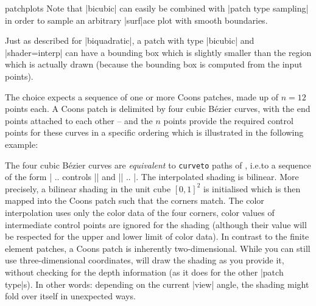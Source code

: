 {\begin{pgfplotslibrary}{patchplots}
Note that |bicubic| can easily be combined with |patch type sampling| in order
to sample an arbitrary |surf|ace plot with smooth boundaries.

Just as described for |biquadratic|, a patch with type |bicubic| and
|shader=interp| can have a bounding box which is slightly smaller than the
region which is actually drawn (because the bounding box is computed from the
input points).

The choice  expects a sequence of one or more Coons
patches, made up of $n=12$ points each. A Coons patch is delimited by four
cubic B\'ezier curves, with the end points attached to each other -- and the
$n$ points provide the required control points for these curves in a specific
ordering which is illustrated in the following example:
%
\begin{codeexample}[]
\end{codeexample}
%
\noindent The four cubic B\'ezier curves are \emph{equivalent} to
\texttt{curveto} paths of \pgfname{}, i.e.\@ to a sequence of the form
| .. controls || and || .. |.
The interpolated shading is bilinear. More precisely, a bilinear shading in the
unit cube $[0,1]^2$ is initialised which is then mapped into the Coons patch
such that the corners match. The color interpolation uses only the color data
of the four corners, color values of intermediate control points are ignored
for the shading (although their value will be respected for the upper and lower
limit of color data). In contrast to the finite element patches, a Coons patch
is inherently two-dimensional. While you can still use three-dimensional
coordinates, \PGFPlots{} will draw the shading as you provide it, without
checking for the depth information (as it does for the other |patch type|s). In
other words: depending on the current |view| angle, the shading might fold over
itself in unexpected ways.


\end{pgfplotslibrary}}
